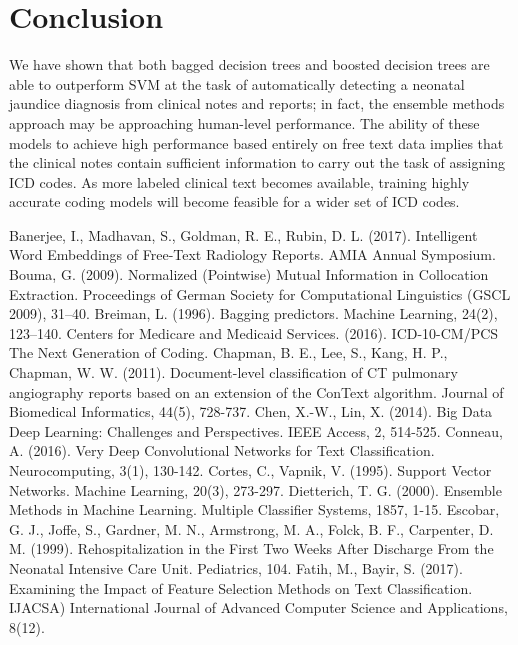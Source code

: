\documentclass[conference]{IEEEtran}
\begin{document}
\section{Conclusion}
We have shown that both bagged decision trees and boosted decision trees are able to outperform SVM at the task of automatically detecting a neonatal jaundice diagnosis from clinical notes and reports; in fact, the ensemble methods approach may be approaching human-level performance. The ability of these models to achieve high performance based entirely on free text data implies that the clinical notes contain sufficient information to carry out the task of assigning ICD codes. As more labeled clinical text becomes available, training highly accurate coding models will become feasible for a wider set of ICD codes. 

\begin{thebibliography}{00}
 Banerjee, I., Madhavan, S., Goldman, R. E., Rubin, D. L. (2017). Intelligent Word Embeddings of Free-Text Radiology Reports. AMIA Annual Symposium.
 Bouma, G. (2009). Normalized (Pointwise) Mutual Information in Collocation Extraction. Proceedings of German Society for Computational Linguistics (GSCL 2009), 31–40.
 Breiman, L. (1996). Bagging predictors. Machine Learning, 24(2), 123–140.
Centers for Medicare and Medicaid Services. (2016). ICD-10-CM/PCS The Next Generation of Coding.
 Chapman, B. E., Lee, S., Kang, H. P., Chapman, W. W. (2011). Document-level classification of CT pulmonary angiography reports based on an extension of the ConText algorithm. Journal of Biomedical Informatics, 44(5), 728-737.
 Chen, X.-W., Lin, X. (2014). Big Data Deep Learning: Challenges and Perspectives. IEEE Access, 2, 514-525.
 Conneau, A. (2016). Very Deep Convolutional Networks for Text Classification. Neurocomputing, 3(1), 130-142.
 Cortes, C., Vapnik, V. (1995). Support Vector Networks. Machine Learning, 20(3), 273-297.
 Dietterich, T. G. (2000). Ensemble Methods in Machine Learning. Multiple Classifier Systems, 1857, 1-15.
 Escobar, G. J., Joffe, S., Gardner, M. N., Armstrong, M. A., Folck, B. F., Carpenter, D. M. (1999). Rehospitalization in the First Two Weeks After Discharge From the Neonatal Intensive Care Unit. Pediatrics, 104.
 Fatih, M., Bayir, S. (2017). Examining the Impact of Feature Selection Methods on Text Classification. IJACSA) International Journal of Advanced Computer Science and Applications, 8(12).

\end{thebibliography}
\end{document}
